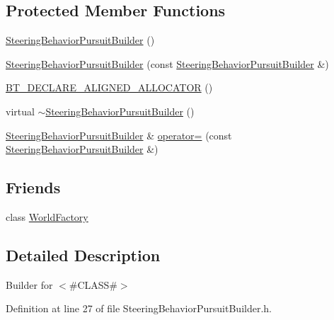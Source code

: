 \subsection*{Protected Member Functions}
\begin{DoxyCompactItemize}
\item 
\mbox{\hyperlink{classnjli_1_1_steering_behavior_pursuit_builder_a2449bb6dbdf296176b92e01350963253}{Steering\+Behavior\+Pursuit\+Builder}} ()
\item 
\mbox{\hyperlink{classnjli_1_1_steering_behavior_pursuit_builder_addd48e49a7ed72114a72bf0db9240dfd}{Steering\+Behavior\+Pursuit\+Builder}} (const \mbox{\hyperlink{classnjli_1_1_steering_behavior_pursuit_builder}{Steering\+Behavior\+Pursuit\+Builder}} \&)
\item 
\mbox{\hyperlink{classnjli_1_1_steering_behavior_pursuit_builder_ac09510e3c97a0ab54592b1ba76b2491d}{B\+T\+\_\+\+D\+E\+C\+L\+A\+R\+E\+\_\+\+A\+L\+I\+G\+N\+E\+D\+\_\+\+A\+L\+L\+O\+C\+A\+T\+OR}} ()
\item 
virtual \mbox{\hyperlink{classnjli_1_1_steering_behavior_pursuit_builder_a9f3d39541fe0374be1eb7e60ac26e89a}{$\sim$\+Steering\+Behavior\+Pursuit\+Builder}} ()
\item 
\mbox{\hyperlink{classnjli_1_1_steering_behavior_pursuit_builder}{Steering\+Behavior\+Pursuit\+Builder}} \& \mbox{\hyperlink{classnjli_1_1_steering_behavior_pursuit_builder_a87802787e16b91ed772cb6297b40f86a}{operator=}} (const \mbox{\hyperlink{classnjli_1_1_steering_behavior_pursuit_builder}{Steering\+Behavior\+Pursuit\+Builder}} \&)
\end{DoxyCompactItemize}
\subsection*{Friends}
\begin{DoxyCompactItemize}
\item 
class \mbox{\hyperlink{classnjli_1_1_steering_behavior_pursuit_builder_acb96ebb09abe8f2a37a915a842babfac}{World\+Factory}}
\end{DoxyCompactItemize}


\subsection{Detailed Description}
Builder for $<$\#\+C\+L\+A\+SS\#$>$ 

Definition at line 27 of file Steering\+Behavior\+Pursuit\+Builder.\+h.



